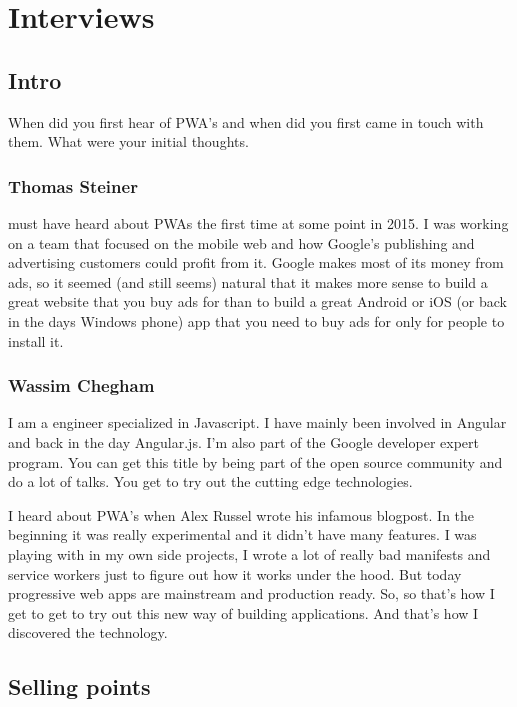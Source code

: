 \chapter{Interviews}
\label{ch:Interview}



	\section{Intro}
	
		When did you first hear of PWA's and when did you first came in touch with them. What were your initial thoughts. 
	
		\subsection{Thomas Steiner}
		
			 must have heard about PWAs the first time at some point in 2015. I was working on a team that focused on the mobile web and how Google’s publishing and advertising customers could profit from it. Google makes most of its money from ads, so it seemed (and still seems) natural that it makes more sense to build a great website that you buy ads for than to build a great Android or iOS (or back in the days Windows phone) app that you need to buy ads for only for people to install it.
		
		\subsection{Wassim Chegham}
		
			I am a engineer specialized in Javascript. I have mainly been involved in Angular and back in the day Angular.js. I'm also part of the Google developer expert program. You can get this title by being part of the open source community and do a lot of talks. You get to try out the cutting edge technologies. 
		
			I heard about PWA's when Alex Russel wrote his infamous blogpost. In the beginning it was really experimental and it didn't have many features. I was playing with in my own side projects, I wrote a lot of really bad manifests and service workers just to figure out how it works under the hood. But today progressive web apps are mainstream and production ready.  So, so that's how I get to get to try out this new way of building applications. And that's how I discovered the technology.
		
	
	\section{Selling points}
	
